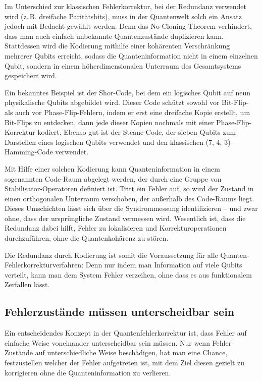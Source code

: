 Im Unterschied zur klassischen Fehlerkorrektur, bei der Redundanz verwendet wird (z. B. dreifache Paritätsbits), muss in der Quantenwelt solch ein Ansatz jedoch mit Bedacht gewählt werden. Denn das No-Cloning-Theorem verhindert, dass man auch einfach unbekannte Quantenzustände duplizieren kann. \cite{nielsen_michael_a_and_isaac_l_chuang_quantum_2010} Stattdessen wird die Kodierung mithilfe einer kohärenten Verschränkung mehrerer Qubits erreicht, sodass die Quanteninformation nicht in einem einzelnen Qubit, sondern in einem höherdimensionalen Unterraum des Gesamtsystems gespeichert wird.

Ein bekanntes Beispiel ist der Shor-Code, bei dem ein logisches Qubit auf neun physikalische Qubits abgebildet wird. Dieser Code schützt sowohl vor Bit-Flip- als auch vor Phase-Flip-Fehlern, indem er erst eine dreifache Kopie erstellt, um Bit-Flips zu entdecken, dann jede dieser Kopien nochmals mit einer Phase-Flip-Korrektur kodiert. \cite{shor_scheme_1995}
Ebenso gut ist der Steane-Code, der sieben Qubits zum Darstellen eines logischen Qubits verwendet und den klassischen (7, 4, 3)-Hamming-Code verwendet. \cite{Steane}

Mit Hilfe einer solchen Kodierung kann Quanteninformation in einem sogenannten Code-Raum abgelegt werden, der durch eine Gruppe von Stabilisator-Operatoren definiert ist. Tritt ein Fehler auf, so wird der Zustand in einen orthogonalen Unterraum verschoben, der außerhalb des Code-Raums liegt. Dieses Umschichten lässt sich über die Syndrommessung identifizieren – und zwar ohne, dass der ursprüngliche Zustand vermessen wird. Wesentlich ist, dass die Redundanz dabei hilft, Fehler zu lokalisieren und Korrekturoperationen durchzuführen, ohne die Quantenkohärenz zu stören.

Die Redundanz durch Kodierung ist somit die Voraussetzung für alle Quanten-Fehlerkorrekturverfahren: Denn nur indem man Information auf viele Qubits verteilt, kann man dem System Fehler \(\)verzeihen, ohne dass es aus funktionalem Zerfallen lässt.

\subsection{Fehlerzustände müssen unterscheidbar sein}
Ein entscheidendes Konzept in der Quantenfehlerkorrektur ist, dass Fehler auf einfache Weise voneinander unterscheidbar sein müssen. Nur wenn Fehler Zustände auf unterschiedliche Weise beschädigen, hat man eine Chance, festzustellen welcher der Fehler aufgetreten ist, mit dem Ziel diesen gezielt zu korrigieren ohne die Quanteninformation zu verlieren.

